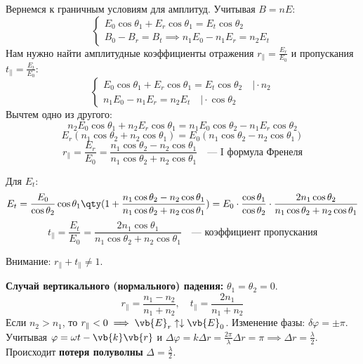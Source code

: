 Вернемся к граничным условиям для амплитуд. Учитывая $B = nE$:
\begin{equation*}
	\begin{cases}
		E_0 \cos\theta_1 + E_r \cos\theta_1 = E_t \cos\theta_2 \\
		B_0 - B_r = B_t \implies n_1 E_0 - n_1 E_r = n_2 E_t
	\end{cases}
\end{equation*}
Нам нужно найти амплитудные коэффициенты отражения $r_\parallel = \frac{E_r}{E_0}$ и пропускания $t_\parallel = \frac{E_t}{E_0}$:
\begin{equation*}
	\begin{cases}
		E_0 \cos\theta_1 + E_r \cos\theta_1 = E_t \cos\theta_2 \quad \big| \cdot n_2 \\
		n_1 E_0 - n_1 E_r = n_2 E_t \quad \big| \cdot \cos\theta_2
	\end{cases}
\end{equation*}
Вычтем одно из другого:
\begin{equation*}
	n_2 E_0 \cos\theta_1 + n_2 E_r \cos\theta_1 = n_1 E_0 \cos\theta_2 - n_1 E_r \cos\theta_2
\end{equation*}
\begin{equation*}
	E_r (n_1 \cos\theta_2 + n_2 \cos\theta_1) = E_0 (n_1 \cos\theta_2 - n_2 \cos\theta_1)
\end{equation*}
\begin{equation}
	r_\parallel = \frac{E_r}{E_0} = \frac{n_1 \cos\theta_2 - n_2 \cos\theta_1}{n_1 \cos\theta_2 + n_2 \cos\theta_1} \quad \text{--- I формула Френеля}
\end{equation}

Для $E_t$:
\begin{equation*}
	E_t = \frac{E_0}{\cos\theta_2} \cos\theta_1 \qty(1 + \frac{n_1 \cos\theta_2 - n_2 \cos\theta_1}{n_1 \cos\theta_2 + n_2 \cos\theta_1}) = E_0 \cdot \frac{\cos\theta_1}{\cos\theta_2} \cdot \frac{2n_1 \cos\theta_2}{n_1 \cos\theta_2 + n_2 \cos\theta_1}
\end{equation*}
\begin{equation}
	t_\parallel = \frac{E_t}{E_0} = \frac{2n_1 \cos\theta_1}{n_1 \cos\theta_2 + n_2 \cos\theta_1} \quad \text{--- коэффициент пропускания}
\end{equation}

\begin{nb}
	Внимание: $r_\parallel + t_\parallel \neq 1$.
\end{nb}

\textbf{Случай вертикального (нормального) падения:} $\theta_1 = \theta_2 = 0$.
\begin{equation*}
	r_\parallel = \frac{n_1 - n_2}{n_1 + n_2}, \quad t_\parallel = \frac{2n_1}{n_1 + n_2}
\end{equation*}
Если $n_2 > n_1$, то $r_\parallel < 0 \implies \vb{E}_r \uparrow\downarrow \vb{E}_0$. Изменение фазы: $\delta\varphi = \pm \pi$.
Учитывая $\varphi = \omega t - \vb{k}\vb{r}$ и $\Delta\varphi = k \Delta r = \frac{2\pi}{\lambda} \Delta r = \pi \implies \Delta r = \frac{\lambda}{2}$.
Происходит \textbf{потеря полуволны} $\Delta = \frac{\lambda}{2}$.

